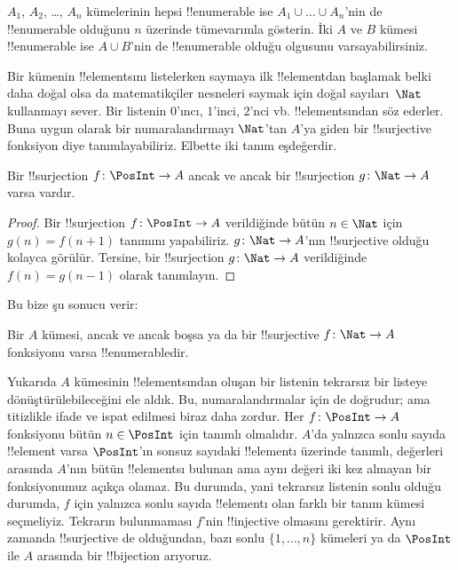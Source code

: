 \begin{prob}
  $A_1$, $A_2$, \dots, $A_n$ kümelerinin hepsi !!{enumerable} ise $A_1 \cup
  \dots \cup A_n$'nin de !!{enumerable} olduğunu $n$ üzerinde tümevarımla
  gösterin. İki $A$ ve $B$ kümesi !!{enumerable} ise $A \cup B$'nin de
  !!{enumerable} olduğu olgusunu varsayabilirsiniz.
\end{prob}

Bir kümenin !!{element}s{}ını listelerken saymaya ilk !!{element}{}dan başlamak
belki daha doğal olsa da matematikçiler nesneleri saymak için doğal
sayıları~$\Nat$ kullanmayı sever. Bir listenin $0$'ıncı, $1$'inci, $2$'nci
vb. !!{element}s{}ından söz ederler. Buna uygun olarak bir numaralandırmayı
$\Nat$'tan $A$'ya giden bir !!{surjective} fonksiyon diye tanımlayabiliriz.
Elbette iki tanım eşdeğerdir.

\begin{prop}
  Bir !!{surjection} $f\colon \PosInt \to A$ ancak ve ancak bir
  !!{surjection} $g\colon \Nat \to A$ varsa vardır.
\end{prop}

\begin{proof}
  Bir !!{surjection} $f\colon \PosInt \to A$ verildiğinde bütün $n \in
  \Nat$ için $g(n)=f(n+1)$ tanımını yapabiliriz. $g\colon \Nat \to A$'nın
  !!{surjective} olduğu kolayca görülür. Tersine, bir !!{surjection}
  $g\colon \Nat \to A$ verildiğinde $f(n)=g(n-1)$ olarak tanımlayın.
\end{proof}

Bu bize şu sonucu verir:

\begin{cor}
Bir $A$ kümesi, ancak ve ancak boşsa ya da bir !!{surjective} $f\colon \Nat
\to A$ fonksiyonu varsa !!{enumerable}{}dir.
\end{cor}

Yukarıda $A$ kümesinin !!{element}s{}ından oluşan bir listenin tekrarsız bir listeye
dönüştürülebileceğini ele aldık. Bu, numaralandırmalar için de doğrudur; ama
titizlikle ifade ve ispat edilmesi biraz daha zordur. Her $f\colon \PosInt
\to A$ fonksiyonu bütün $n \in \PosInt$ için tanımlı olmalıdır. $A$'da
yalnızca sonlu sayıda !!{element} varsa $\PosInt$'ın sonsuz sayıdaki
!!{element}{}ı üzerinde tanımlı, değerleri arasında $A$'nın bütün
!!{element}s{}ı bulunan ama aynı değeri iki kez almayan bir fonksiyonumuz
açıkça olamaz. Bu durumda, yani tekrarsız listenin sonlu olduğu durumda,
$f$ için yalnızca sonlu sayıda !!{element}{}ı olan farklı bir tanım kümesi
seçmeliyiz. Tekrarın bulunmaması $f$'nin !!{injective} olmasını gerektirir.
Aynı zamanda !!{surjective} de olduğundan, bazı sonlu $\{1, \dots, n\}$
kümeleri ya da $\PosInt$ ile $A$ arasında bir !!{bijection} arıyoruz.

